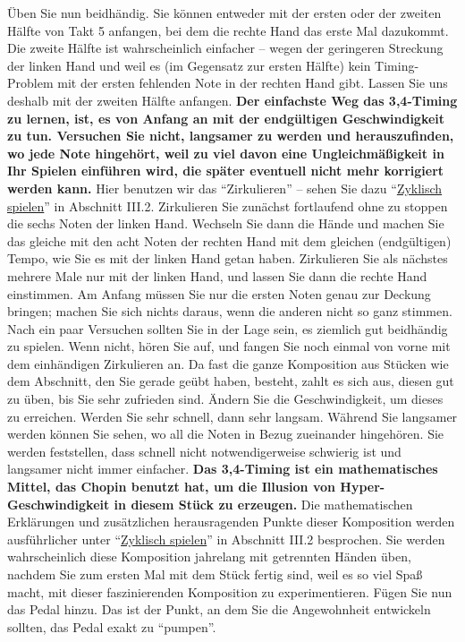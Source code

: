 Üben Sie nun beidhändig.
Sie können entweder mit der ersten oder der zweiten Hälfte von Takt 5 anfangen, bei dem die rechte Hand das erste Mal dazukommt.
Die zweite Hälfte ist wahrscheinlich einfacher -- wegen der geringeren Streckung der linken Hand und weil es (im Gegensatz zur ersten Hälfte) kein Timing-Problem mit der ersten fehlenden Note in der rechten Hand gibt.
Lassen Sie uns deshalb mit der zweiten Hälfte anfangen.
\textbf{Der einfachste Weg das 3,4-Timing zu lernen, ist, es von Anfang an mit der endgültigen Geschwindigkeit zu tun.
Versuchen Sie nicht, langsamer zu werden und herauszufinden, wo jede Note hingehört, weil zu viel davon eine Ungleichmäßigkeit in Ihr Spielen einführen wird, die später eventuell nicht mehr korrigiert werden kann.}
Hier benutzen wir das \enquote{Zirkulieren} -- sehen Sie dazu \enquote{\hyperref[c1iii2]{Zyklisch spielen}} in Abschnitt III.2.
Zirkulieren Sie zunächst fortlaufend ohne zu stoppen die sechs Noten der linken Hand.
Wechseln Sie dann die Hände und machen Sie das gleiche mit den acht Noten der rechten Hand mit dem gleichen (endgültigen) Tempo, wie Sie es mit der linken Hand getan haben.
Zirkulieren Sie als nächstes mehrere Male nur mit der linken Hand, und lassen Sie dann die rechte Hand einstimmen.
Am Anfang müssen Sie nur die ersten Noten genau zur Deckung bringen; machen Sie sich nichts daraus, wenn die anderen nicht so ganz stimmen.
Nach ein paar Versuchen sollten Sie in der Lage sein, es ziemlich gut beidhändig zu spielen.
Wenn nicht, hören Sie auf, und fangen Sie noch einmal von vorne mit dem einhändigen Zirkulieren an.
Da fast die ganze Komposition aus Stücken wie dem Abschnitt, den Sie gerade geübt haben, besteht, zahlt es sich aus, diesen gut zu üben, bis Sie sehr zufrieden sind.
Ändern Sie die Geschwindigkeit, um dieses zu erreichen.
Werden Sie sehr schnell, dann sehr langsam.
Während Sie langsamer werden können Sie sehen, wo all die Noten in Bezug zueinander hingehören.
Sie werden feststellen, dass schnell nicht notwendigerweise schwierig ist und langsamer nicht immer einfacher.
\textbf{Das 3,4-Timing ist ein mathematisches Mittel, das Chopin benutzt hat, um die Illusion von Hyper-Geschwindigkeit in diesem Stück zu erzeugen.}
Die mathematischen Erklärungen und zusätzlichen herausragenden Punkte dieser Komposition werden ausführlicher unter \enquote{\hyperref[c1iii2]{Zyklisch spielen}} in Abschnitt III.2 besprochen.
Sie werden wahrscheinlich diese Komposition jahrelang mit getrennten Händen üben, nachdem Sie zum ersten Mal mit dem Stück fertig sind, weil es so viel Spaß macht, mit dieser faszinierenden Komposition zu experimentieren.
Fügen Sie nun das Pedal hinzu.
Das ist der Punkt, an dem Sie die Angewohnheit entwickeln sollten, das Pedal exakt zu \enquote{pumpen}.

